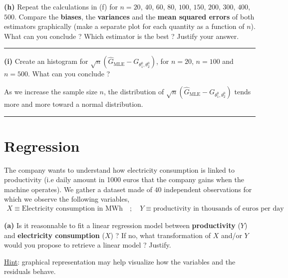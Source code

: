 \documentclass[10pt, a4paper, nofootinbib]{scrartcl}
\begin{document}
\textbf{(h)} Repeat the calculations in (f) for $n = 20$, $40$, $60$, $80$, $100$, $150$, $200$, $300$, $400$, $500$. Compare the \textbf{biases}, the \textbf{variances} and the \textbf{mean squared errors} of both estimators graphically (make a separate plot for each quantity as a function of $n$). What can you conclude ? Which estimator is the best ? Justify your answer.

\begin{center}\rule{6cm}{0.4pt}\end{center}

\textbf{(i)} Create an histogram for $\sqrt{n}(\hat{G}_{\text{MLE}} - G_{\theta_1^0, \theta_2^0} )$, for $n = 20$, $n = 100$ and $n = 500$. What can you conclude ?


As we increase the sample size $n$, the distribution of $\sqrt{n}(\hat{G}_{\text{MLE}} - G_{\theta_1^0, \theta_2^0} )$ tends more and more toward a normal distribution.


\begin{center}\rule{6cm}{0.4pt}\end{center}

\section{Regression}

The company wants to understand how electricity consumption is linked to productivity (i.e daily amount in 1000 euros that the company gains when the machine operates). We gather a dataset made of $40$ independent observations for which we observe the following variables,
\begin{equation}
  \begin{array}{rl}
    X \equiv \text{Electricity consumption in MWh} \quad ; \quad Y \equiv \text{productivity in thousands of euros per day}
  \end{array}
\end{equation}

\textbf{(a)} Is it reasonnable to fit a linear regression model between \textbf{productivity} ($Y$) and \textbf{electricity consumption} ($X$) ? 
If no, what transformation of $X$ and/or $Y$ would you propose to retrieve a linear model ? Justify.

\underline{Hint}: graphical representation may help visualize how the variables and the residuals behave.
\end{document}

